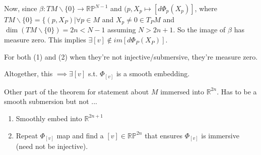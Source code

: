 \documentclass[12pt,letterpaper]{article}
\begin{document}
Now, since $\beta: TM \backslash \{0\} \rightarrow \mathbb{R}\mathbb{P}^{N-1}$ and $(p, X_p \mapsto [d \Phi_p (X_p)]$, where $TM \backslash \{0\} = \{(p, X_P) | \forall p \in M$ and $X_p \neq 0 \in T_P M$ and $\dim (TM \backslash \{0\}) = 2n < N-1$ assuming $N>2n +1$. So the image of $\beta$ has measure zero. This implies $\exists [v] \notin im[d\Phi_P(X_P)]$. 

For both (1) and (2) when they're not injective/submersive, they're measure zero.

Altogether, this $\implies \exists [v]$ s.t. $\Phi_{[v]}$ is a smooth embedding. 

Other part of the theorem for statement about $M$ immersed into $\mathbb{R}^{2n}$. Has to be a smooth submersion but not ...

\begin{enumerate}
    \item Smoothly embed into $\mathbb{R}^{2n+1}$
    \item Repeat $\Phi_{[v]}$ map and find a $[v] \in \mathbb{R}\mathbb{P}^{2n}$ that ensures $\Phi_{[v]}$ is immersive (need not be injective). 
\end{enumerate}
\end{document}
